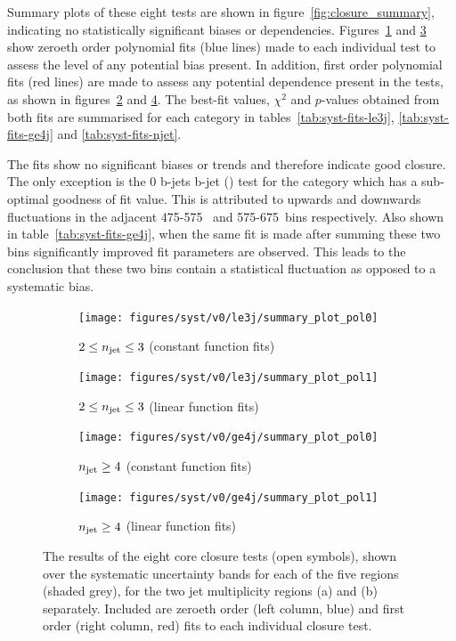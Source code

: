 Summary plots of these eight tests are shown in
figure~\ref{fig:closure_summary}, indicating no statistically significant biases
or \HT dependencies. Figures~\ref{fig:closure_fit_le3j_pol0} and \ref{fig:closure_fit_ge4j_pol0} show
zeroeth order polynomial fits (blue lines) made to each individual test to assess the 
level of any potential bias present. In addition, first order polynomial fits 
(red lines) are made to assess any potential \HT dependence present in the
tests, as shown
in figures~\ref{fig:closure_fit_le3j_pol1} and \ref{fig:closure_fit_ge4j_pol1}.
The best-fit values, $\chi^2$ and $p$-values 
obtained from both fits are summarised for each \nj category in
tables~\ref{tab:syst-fits-le3j}, \ref{tab:syst-fits-ge4j} and
\ref{tab:syst-fits-njet}.

The fits show no significant biases or trends and therefore indicate good
closure. The only exception is the 0 b-jets  b-jet (\mj) test for the
\njhigh category which has a sub-optimal goodness of fit value. This is 
attributed to upwards and downwards fluctuations in the adjacent 475-575~\gev
and 575-675~\gev bins respectively. Also shown in table~\ref{tab:syst-fits-ge4j},
when the same fit is made after summing these two bins significantly improved
fit parameters are observed. This leads to the conclusion that these two
bins contain a statistical fluctuation as opposed to a systematic bias.

\begin{figure}[ht!]
  \centering
  \begin{subfigure}[b]{0.46\textwidth}
    \texttt{[image: figures/syst/v0/le3j/summary\_plot\_pol0]}
    \caption{$2 \leq n_{\text{jet}} \leq 3$ (constant function fits)}
    \label{fig:closure_fit_le3j_pol0}
  \end{subfigure}
  \begin{subfigure}[b]{0.46\textwidth}
    \texttt{[image: figures/syst/v0/le3j/summary\_plot\_pol1]}
    \caption{$2 \leq n_{\text{jet}} \leq 3$ (linear function fits)}
    \label{fig:closure_fit_le3j_pol1}
  \end{subfigure}
  \begin{subfigure}[b]{0.46\textwidth}
    \texttt{[image: figures/syst/v0/ge4j/summary\_plot\_pol0]}
    \caption{$n_{\text{jet}} \geq 4$ (constant function fits)}
    \label{fig:closure_fit_ge4j_pol0}
  \end{subfigure}
  \begin{subfigure}[b]{0.46\textwidth}
    \texttt{[image: figures/syst/v0/ge4j/summary\_plot\_pol1]}
    \caption{$n_{\text{jet}} \geq 4$ (linear function fits)}
    \label{fig:closure_fit_ge4j_pol1}
  \end{subfigure}
  \caption{The results of the eight core closure tests (open symbols), shown 
  over the systematic uncertainty bands for each of the five \HT regions
  (shaded grey), for the two jet multiplicity regions (a) \njlow and (b) \njhigh 
  separately. Included are zeroeth order (left column, blue) and first order
  (right column, red) fits to each individual closure test.}
  \label{fig:closure_fits}
\end{figure}

